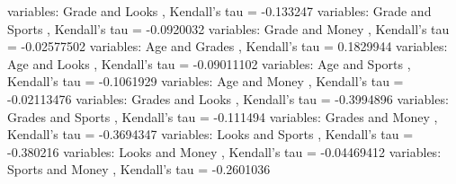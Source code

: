 \documentclass[a4paper]{article}
\begin{document}
\begin{itemize}
\begin{Schunk}
\begin{Soutput}
variables:  Grade  and  Looks , Kendall's tau =  -0.133247 
variables:  Grade  and  Sports , Kendall's tau =  -0.0920032 
variables:  Grade  and  Money , Kendall's tau =  -0.02577502 
variables:  Age  and  Grades , Kendall's tau =  0.1829944 
variables:  Age  and  Looks , Kendall's tau =  -0.09011102 
variables:  Age  and  Sports , Kendall's tau =  -0.1061929 
variables:  Age  and  Money , Kendall's tau =  -0.02113476 
variables:  Grades  and  Looks , Kendall's tau =  -0.3994896 
variables:  Grades  and  Sports , Kendall's tau =  -0.111494 
variables:  Grades  and  Money , Kendall's tau =  -0.3694347 
variables:  Looks  and  Sports , Kendall's tau =  -0.380216 
variables:  Looks  and  Money , Kendall's tau =  -0.04469412 
variables:  Sports  and  Money , Kendall's tau =  -0.2601036 
\end{Soutput}
\end{Schunk}
\end{itemize}
\end{document}
